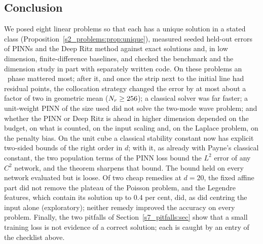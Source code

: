 \subsection{Conclusion}\label{s8_discussion:sec:conclusion}

We posed eight linear problems so that each has a unique solution in a stated class
(Proposition~\ref{s2_problems:prop:unique}), measured seeded held-out errors of PINNs and the Deep
Ritz method against exact solutions and, in low dimension, finite-difference baselines, and checked
the benchmark and the dimension study in part with separately written code. On these problems an \LBFGS\
phase mattered most; after it, and once the strip next to the initial line had residual points, the
collocation strategy changed the error by at most about a factor of two in geometric mean
($N_{r}\ge256$); a classical solver was far faster; a unit-weight PINN of the size used did not solve
the two-mode wave problem; and whether the PINN or Deep Ritz is ahead in higher dimension depended
on the budget, on what is counted, on the input scaling and, on the Laplace problem, on the penalty
bias. On the unit cube a classical stability constant now has explicit two-sided bounds of the right
order in $d$; with it, as already with Payne's classical constant, the two population terms of the
PINN loss bound the $L^2$ error of any $C^2$ network, and the theorem sharpens that bound. The bound held on every network
evaluated but is loose. Of two cheap remedies at $d=20$, the fixed affine part did not remove the
plateau of the Poisson problem, and the Legendre features, which contain its solution up to 0.4 per
cent, did, as did centring the input alone (exploratory); neither remedy improved the accuracy on
every problem. Finally, the two pitfalls of
Section~\ref{s7_pitfalls:sec} show that a small training loss is not evidence of a correct solution;
each is caught by an entry of the checklist above.
